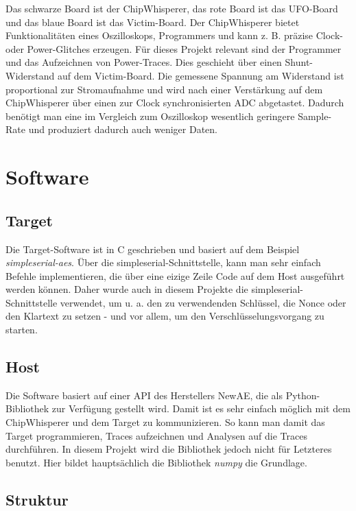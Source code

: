 \documentclass[a4paper,ngerman]{scrreprt}
\begin{document}
Das schwarze Board ist der ChipWhisperer, das rote Board ist das UFO-Board und
das blaue Board ist das Victim-Board. Der ChipWhisperer bietet Funktionalitäten
eines Oszilloskops, Programmers und kann z. B. präzise Clock- oder
Power-Glitches erzeugen. Für dieses Projekt relevant sind der Programmer und das
Aufzeichnen von Power-Traces. Dies geschieht über einen Shunt-Widerstand auf dem
Victim-Board. Die gemessene Spannung am Widerstand ist proportional zur
Stromaufnahme und wird nach einer Verstärkung auf dem ChipWhisperer über einen
zur Clock synchronisierten ADC abgetastet. Dadurch benötigt man eine im
Vergleich zum Oszilloskop wesentlich geringere Sample-Rate und produziert
dadurch auch weniger Daten.


\section{Software}

\subsection{Target}

Die Target-Software ist in C geschrieben und basiert auf dem Beispiel
\emph{simpleserial-aes}. Über die simpleserial-Schnittstelle, kann man sehr
einfach Befehle implementieren, die über eine eizige Zeile Code auf dem Host
ausgeführt werden können. Daher wurde auch in diesem Projekte die
simpleserial-Schnittstelle verwendet, um u. a. den zu verwendenden Schlüssel,
die Nonce oder den Klartext zu setzen - und vor allem, um den
Verschlüsselungsvorgang zu starten.


\subsection{Host}

Die Software basiert auf einer API des Herstellers NewAE, die als
Python-Bibliothek zur Verfügung gestellt wird. Damit ist es sehr einfach möglich
mit dem ChipWhisperer und dem Target zu kommunizieren. So kann man damit das
Target programmieren, Traces aufzeichnen und Analysen auf die Traces
durchführen. In diesem Projekt wird die Bibliothek jedoch nicht für Letzteres
benutzt. Hier bildet hauptsächlich die Bibliothek \emph{numpy} die Grundlage.


\subsection{Struktur}
\end{document}
